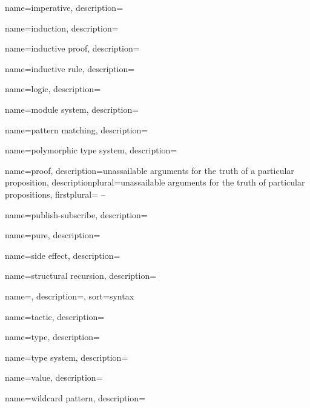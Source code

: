 {
  name={imperative},
  description={}
}

{
  name={induction},
  description={}
}

{
  name={inductive proof},
  description={}
}

{
  name={inductive rule},
  description={}
}

{
  name={logic},
  description={}
}

{
  name={module system},
  description={}
}

{
  name={pattern matching},
  description={}
}

{
  name={polymorphic type system},
  description={}
}

{
  name={proof},
  description={unassailable arguments for the truth of a particular
  proposition},
  descriptionplural={unassailable arguments for the truth of particular
  propositions},
  firstplural={ -- }
}

{
  name={publish-subscribe},
  description={}
}

{
  name={pure},
  description={}
}

{
  name={side effect},
  description={}
}

{
  name={structural recursion},
  description={}
}

{
  name=,
  description={},
  sort={syntax}
}

{
  name={tactic},
  description={}
}

{
  name={type},
  description={}
}

{
  name={type system},
  description={}
}

{
  name={value},
  description={}
}

{
  name={wildcard pattern},
  description={}
}




